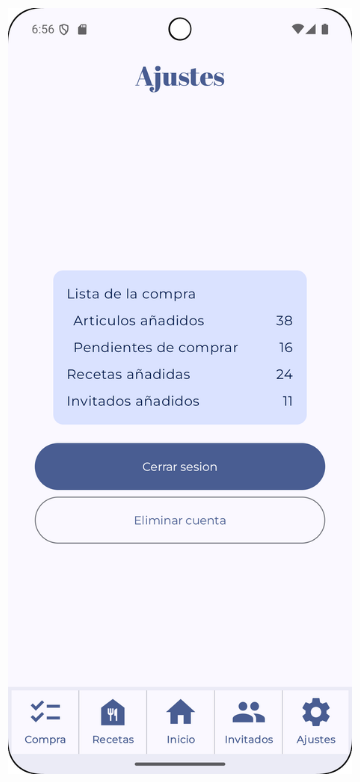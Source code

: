 \begin{figure}[H]
    \centering

    \begin{subfigure}[b]{0.3\textwidth}
      \includegraphics[width=\textwidth]{./img/manual/pinche_settings.png}

\end{subfigure}
\end{figure}
